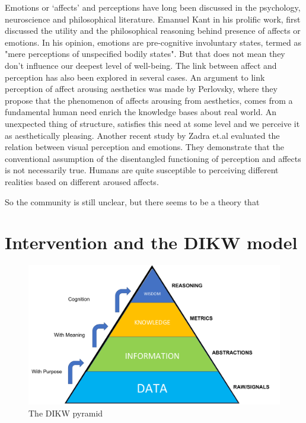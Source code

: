 Emotions or `affects' and perceptions have long been discussed in the psychology, neuroscience and philosophical literature. Emanuel Kant in his prolific work, first discussed the utility and the philosophical reasoning behind presence of affects or emotions\cite{kant1987critique}. In his opinion, emotions are pre-cognitive involuntary states, termed as "mere perceptions of unspecified bodily states"\cite{borges2004can}. But that does not mean they don't influence our deepest level of well-being.
The link between affect and perception has also been explored in several cases. An argument to link perception of affect arousing aesthetics was made by Perlovsky\cite{perlovsky2014aesthetic}, where they propose that the phenomenon of affects arousing from aesthetics, comes from a fundamental human need enrich the knowledge bases about real world. An unexpected thing of structure, satisfies this need at some level and we perceive it as aesthetically pleasing. Another recent study by Zadra et.al\cite{zadra2011emotion} evaluated the relation between visual perception and emotions. They demonstrate that the conventional assumption of the disentangled functioning of perception and affects is not necessarily true. Humans are quite susceptible to perceiving different realities based on different aroused affects. 

So the community is still unclear, but there seems to be a theory that  

\section{Intervention and the DIKW model}

\begin{figure}[t!]
    \centering
    \includegraphics[width=\columnwidth]{DIKW.pdf}
    \caption{The DIKW pyramid}
    \label{fig:dikw}
\end{figure}


